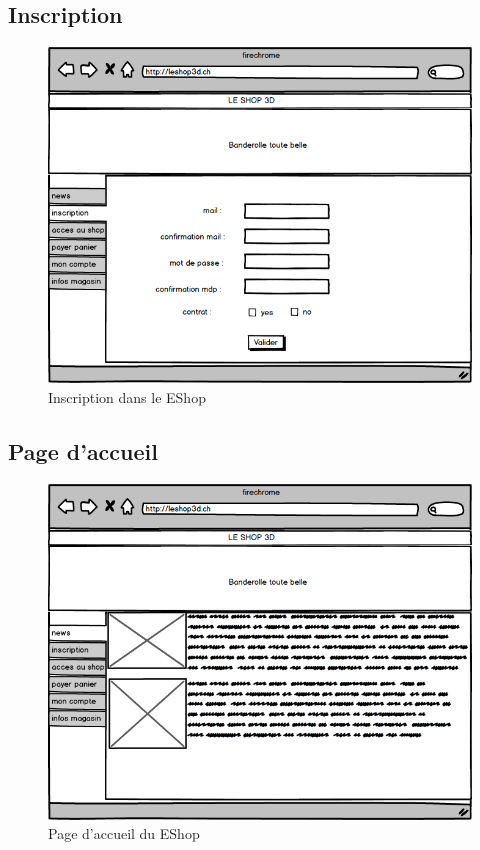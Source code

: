 \documentclass[12pt]{article}
\begin{document}
\subsection{Inscription}

\begin{figure}[ht]
    \center
    \includegraphics[scale=0.6]{../Maquettes/inscription.jpeg}
    \caption*{Inscription dans le EShop}
\end{figure}

\newpage
\subsection{Page d'accueil}

\begin{figure}[ht]
    \center
    \includegraphics[scale=0.6]{../Maquettes/page_accueil.jpeg}
    \caption*{Page d'accueil du EShop}
\end{figure}
\end{document}
